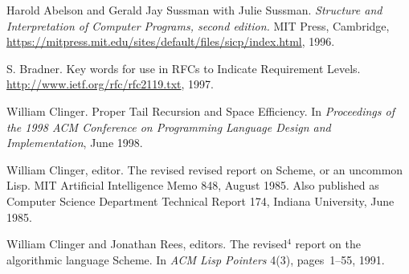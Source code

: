 \begin{thebibliography}{999}

Harold Abelson and Gerald Jay Sussman with Julie Sussman.
{\em Structure and Interpretation of Computer Programs, second edition.}
MIT Press, Cambridge, \url{https://mitpress.mit.edu/sites/default/files/sicp/index.html}, 1996.


S. Bradner.
Key words for use in RFCs to Indicate Requirement Levels.
\url{http://www.ietf.org/rfc/rfc2119.txt}, 1997.



William Clinger.
Proper Tail Recursion and Space Efficiency.
In {\em Proceedings of the 1998 ACM Conference on Programming
 Language Design and Implementation}, June 1998.


William Clinger, editor.
The revised revised report on Scheme, or an uncommon Lisp.
MIT Artificial Intelligence Memo 848, August 1985.
Also published as Computer Science Department Technical Report 174,
  Indiana University, June 1985.


William Clinger and Jonathan Rees, editors.
The revised$^4$ report on the algorithmic language Scheme.
In {\em ACM Lisp Pointers} 4(3), pages~1--55, 1991.



\end{thebibliography}
